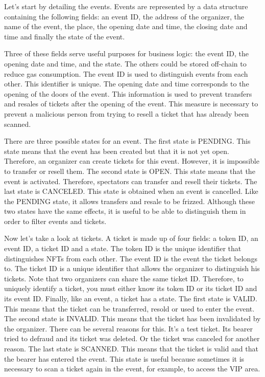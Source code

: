 \documentclass[a4paper,11pt,oneside]{report}
\begin{document}
Let's start by detailing the events. Events are represented by a data structure containing the following fields: an event ID, the address of the organizer, the name of the event, the place, the opening date and time, the closing date and time and finally the state of the event. 

Three of these fields serve useful purposes for business logic: the event ID, the opening date and time, and the state. The others could be stored off-chain to reduce gas consumption. The event ID is used to distinguish events from each other. This identifier is unique. The opening date and time corresponds to the opening of the doors of the event. This information is used to prevent transfers and resales of tickets after the opening of the event. This measure is necessary to prevent a malicious person from trying to resell a ticket that has already been scanned.

There are three possible states for an event. The first state is PENDING. This state means that the event has been created but that it is not yet open. Therefore, an organizer can create tickets for this event. However, it is impossible to transfer or resell them. The second state is OPEN. This state means that the event is activated. Therefore, spectators can transfer and resell their tickets. The last state is CANCELED. This state is obtained when an event is cancelled. Like the PENDING state, it allows transfers and resale to be frizzed. Although these two states have the same effects, it is useful to be able to distinguish them in order to filter events and tickets.

Now let's take a look at tickets. A ticket is made up of four fields: a token ID, an event ID, a ticket ID and a state. The token ID is the unique identifier that distinguishes NFTs from each other. The event ID is the event the ticket belongs to. The ticket ID is a unique identifier that allows the organizer to distinguish his tickets. Note that two organizers can share the same ticket ID. Therefore, to uniquely identify a ticket, you must either know its token ID or its ticket ID and its event ID. Finally, like an event, a ticket has a state. The first state is VALID. This means that the ticket can be transferred, resold or used to enter the event. The second state is INVALID. This means that the ticket has been invalidated by the organizer. There can be several reasons for this. It's a test ticket. Its bearer tried to defraud and its ticket was deleted. Or the ticket was canceled for another reason. The last state is SCANNED. This means that the ticket is valid and that the bearer has entered the event. This state is useful because sometimes it is necessary to scan a ticket again in the event, for example, to access the VIP area.
\end{document}
